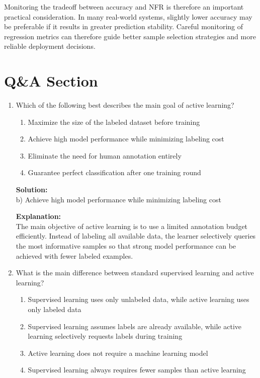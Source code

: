 \documentclass{article}
\begin{document}
Monitoring the tradeoff between accuracy and NFR is therefore an important practical consideration. In many real-world systems, slightly lower accuracy may be preferable if it results in greater prediction stability. Careful monitoring of regression metrics can therefore guide better sample selection strategies and more reliable deployment decisions.

\section{Q\&A Section}

\begin{enumerate}

\item Which of the following best describes the main goal of active learning?

\begin{enumerate}
    \item Maximize the size of the labeled dataset before training
    \item Achieve high model performance while minimizing labeling cost
    \item Eliminate the need for human annotation entirely
    \item Guarantee perfect classification after one training round
\end{enumerate}

\textbf{Solution:} \\
b) Achieve high model performance while minimizing labeling cost

\textbf{Explanation:} \\
The main objective of active learning is to use a limited annotation budget efficiently. Instead of labeling all available data, the learner selectively queries the most informative samples so that strong model performance can be achieved with fewer labeled examples.

\vspace{1em}

\item What is the main difference between standard supervised learning and active learning?

\begin{enumerate}
    \item Supervised learning uses only unlabeled data, while active learning uses only labeled data
    \item Supervised learning assumes labels are already available, while active learning selectively requests labels during training
    \item Active learning does not require a machine learning model
    \item Supervised learning always requires fewer samples than active learning
\end{enumerate}


\end{enumerate}
\end{document}
